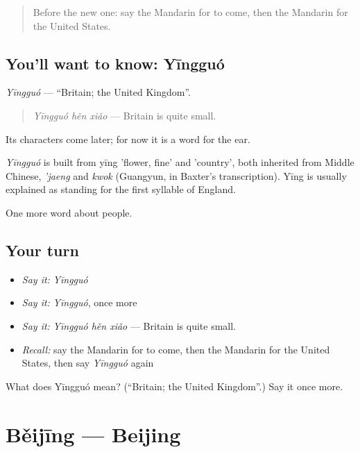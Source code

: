 \begin{quote}
Before the new one: say the Mandarin for to come, then the Mandarin for the United States.
\end{quote}

\subsection*{You'll want to know: Yīngguó}
\emph{Yīngguó} — \textquotedblleft{}Britain; the United Kingdom\textquotedblright{}.

\begin{quote}
\emph{Yīngguó hěn xiǎo} — Britain is quite small.
\end{quote}

Its characters come later; for now it is a word for the ear.

\begin{cousinweb}
\emph{Yīngguó} is built from yīng 'flower, fine' and  'country', both inherited from Middle Chinese, \emph{'jaeng} and \emph{kwok} (Guangyun, in Baxter's transcription). Yīng is usually explained as standing for the first syllable of England.
\end{cousinweb}

\begin{grammarlens}[title={What you've built}]
One more word about people.
\end{grammarlens}

\subsection*{Your turn}
\begin{itemize}
\raggedright
  \item \emph{Say it:} \emph{Yīngguó}
  \item \emph{Say it:} \emph{Yīngguó}, once more
  \item \emph{Say it:} \emph{Yīngguó hěn xiǎo} — Britain is quite small.
  \item \emph{Recall:} say the Mandarin for to come, then the Mandarin for the United States, then say \emph{Yīngguó} again
\end{itemize}

\begin{tcolorbox}[breakable,colback=teal!4,colframe=teal!35!black,title={Before you move on}]
What does Yīngguó mean? (\textquotedblleft{}Britain; the United Kingdom\textquotedblright{}.) Say it once more.
\end{tcolorbox}
\section[Běijīng]{Běijīng — Beijing}

